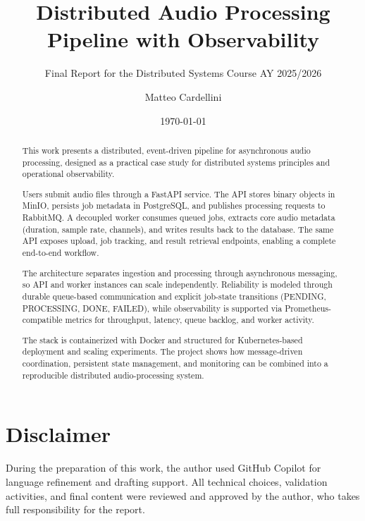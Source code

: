 \documentclass{scrartcl}
\title{\LARGE
    Distributed Audio Processing Pipeline with Observability
}
\subtitle{Final Report for the Distributed Systems Course AY 2025/2026}
\author{
    Matteo Cardellini \\ \emailaddr{matteo.cardellini@studio.unibo.it}
}
\date{\today}
\begin{document}
\maketitle

\begin{abstract} %

This work presents a distributed, event-driven pipeline for asynchronous audio processing, designed as a practical case study for distributed systems principles and operational observability.

Users submit audio files through a FastAPI service. The API stores binary objects in MinIO, persists job metadata in PostgreSQL, and publishes processing requests to RabbitMQ. A decoupled worker consumes queued jobs, extracts core audio metadata (duration, sample rate, channels), and writes results back to the database. The same API exposes upload, job tracking, and result retrieval endpoints, enabling a complete end-to-end workflow.

The architecture separates ingestion and processing through asynchronous messaging, so API and worker instances can scale independently. Reliability is modeled through durable queue-based communication and explicit job-state transitions (PENDING, PROCESSING, DONE, FAILED), while observability is supported via Prometheus-compatible metrics for throughput, latency, queue backlog, and worker activity.

The stack is containerized with Docker and structured for Kubernetes-based deployment and scaling experiments. The project shows how message-driven coordination, persistent state management, and monitoring can be combined into a reproducible distributed audio-processing system.

\end{abstract}

\section*{Disclaimer}

During the preparation of this work, the author used GitHub Copilot for language refinement and drafting support.
All technical choices, validation activities, and final content were reviewed and approved by the author, who takes full responsibility for the report.

\end{document}
